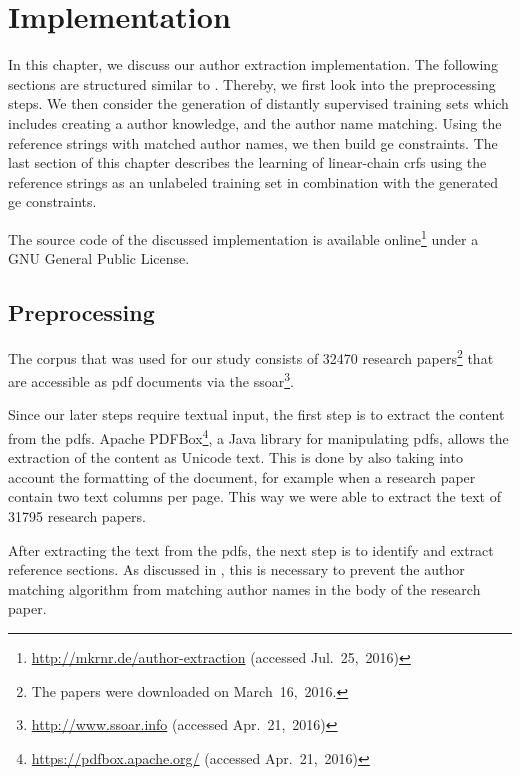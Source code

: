 \chapter{Implementation}\label{cha:implementation}

In this chapter, we discuss our author extraction implementation.
The following sections are structured similar to .
Thereby, we first look into the preprocessing steps.
We then consider the generation of distantly supervised training sets which includes creating a author knowledge, and the author name matching.
Using the reference strings with matched author names, we then build \gls{ge} constraints.
The last section of this chapter describes the learning of \glspl{linear-chain crf} using the reference strings as an unlabeled training set in combination with the generated \gls{ge} constraints.

The source code of the discussed implementation is available online\footnote{\url{http://mkrnr.de/author-extraction} (accessed Jul.~25,~2016)} under a GNU General Public License.

\section{Preprocessing}\label{sec:i-preprocessing}

The corpus that was used for our study consists of \num{32470} research papers\footnote{The papers were downloaded on March~16,~2016.} that are accessible as \gls{pdf} documents via the \gls{ssoar}\footnote{\url{http://www.ssoar.info} (accessed Apr.~21,~2016)}.

Since our later steps require textual input, the first step is to extract the content from the \glspl{pdf}.
Apache PDFBox\footnote{\url{https://pdfbox.apache.org/} (accessed Apr.~21,~2016)}, a Java library for manipulating \glspl{pdf}, allows the extraction of the content as Unicode text.
This is done by also taking into account the formatting of the document, for example when a research paper contain two text columns per page.
This way we were able to extract the text of \num{31795} research papers.

\bigskip

After extracting the text from the \glspl{pdf}, the next step is to identify and extract reference sections.
As discussed in , this is necessary to prevent the author matching algorithm from matching author names in the body of the research paper.

